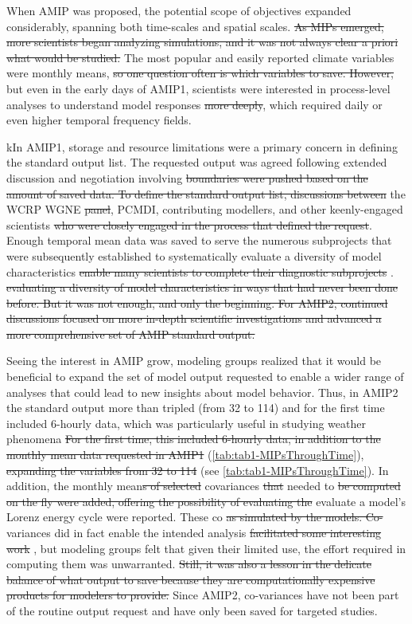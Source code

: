 \documentclass[gmd, preprint]{copernicus}
\begin{document}
{\color{blue}When AMIP was proposed, the potential scope of objectives expanded considerably, spanning both time-scales and spatial scales.} \sout{As MIPs emerged, more scientists began analyzing simulations, and it was not always clear a priori what would be studied.} The most popular and easily reported climate variables were monthly means, \sout{so one question often is which variables to save. However,} {\color{blue}but} even in the early days of AMIP1, scientists were interested in process-level analyses to understand model responses\sout{ more deeply}, which required daily or even higher temporal frequency fields.

kIn AMIP1, {\color{blue}storage and resource limitations were a primary concern in defining the standard output list. The requested output was agreed following extended discussion and negotiation involving} \sout{boundaries were pushed based on the amount of saved data. To define the standard output list, discussions between} the WCRP WGNE \sout{panel}, PCMDI, contributing modellers, and other {\color{blue}keenly-engaged} scientists \sout{who were closely engaged in the process that defined the request}. Enough temporal mean data was saved to {\color{blue}serve the numerous subprojects that were subsequently established to systematically evaluate a diversity of model characteristics} \sout{enable many scientists to complete their diagnostic subprojects} \citep{gates_amip_1995}. \sout{evaluating a diversity of model characteristics in ways that had never been done before. But it was not enough, and only the beginning. For AMIP2, continued discussions focused on more in-depth scientific investigations and advanced a more comprehensive set of AMIP standard output.} 

{\color{blue}Seeing the interest in AMIP grow, modeling groups realized that it would be beneficial to expand the set of model output requested to enable a wider range of analyses that could lead to new insights about model behavior. Thus, in AMIP2 the standard output more than tripled (from 32 to 114) and for the first time included 6-hourly data, which was particularly useful in studying weather phenomena} \sout{For the first time, this included 6-hourly data, in addition to the monthly mean data requested in AMIP1 }(\autoref{tab:tab1-MIPsThroughTime}), \sout{expanding the variables from 32 to 114} (see \autoref{tab:tab1-MIPsThroughTime}). In addition, {\color{blue} the} monthly mean\sout{s of selected} covariances \sout{that} needed to \sout{be computed on the fly were added, offering the possibility of evaluating the} {\color{blue}evaluate a model's} Lorenz energy cycle {\color{blue} were reported. These co} \sout{as simulated by the models. Co-}variances {\color{blue} did in fact enable the intended analysis} \sout{facilitated some interesting work} \citep{boer_energy_2008}, {\color{blue}but modeling groups felt that given their limited use, the effort required in computing them was unwarranted}. \sout{Still, it was also a lesson in the delicate balance of what output to save because they are computationally expensive products for modelers to provide.} Since AMIP2, co-variances have not been part of the routine output request and have only been saved for targeted studies.
\end{document}
